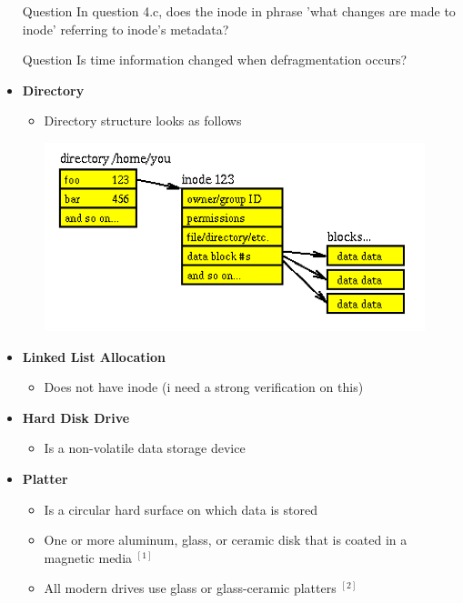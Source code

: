 \documentclass[12pt]{article}
\begin{document}
\begin{itemize}
    \item [\color{blue}Question\color{black}] In question 4.c, does the inode in phrase 'what changes are made to inode' referring to inode's metadata?
    \item [\color{blue}Question\color{black}] Is time information changed when defragmentation occurs?
    \item \textbf{Directory}

    \begin{itemize}
        \item Directory structure looks as follows

        \begin{center}
        \includegraphics[width=0.8\linewidth]{../images/midterm_4_solution_52.png}
        \end{center}
    \end{itemize}

    \item \textbf{Linked List Allocation}

    \begin{itemize}
        \item Does not have inode (i need a strong verification on this)
    \end{itemize}

    \item \textbf{Hard Disk Drive}

    \begin{itemize}
        \item Is a non-volatile data storage device
    \end{itemize}

    \item \textbf{Platter}

    \begin{itemize}
        \item Is a circular hard surface on which data is stored
        \item One or more aluminum, glass, or ceramic disk that
    is coated in a magnetic media $^{[1]}$
        \item All modern drives use glass or glass-ceramic platters $^{[2]}$
    \end{itemize}


\end{itemize}
\end{document}
